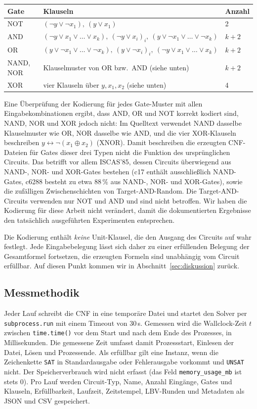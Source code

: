 \documentclass[a4paper,12pt]{article}
\theoremstyle{definition}
\begin{document}
\begin{center}
\begin{tabular}{lll}
\toprule
Gate & Klauseln & Anzahl \\
\midrule
NOT & $(\neg y \vee \neg x_1),\ (y \vee x_1)$ & 2 \\
AND & $(\neg y \vee x_1 \vee \ldots \vee x_k),\ (\neg y \vee x_i)_{i},\ (y \vee \neg x_1 \vee \ldots \vee \neg x_k)$ & $k+2$ \\
OR & $(y \vee \neg x_1 \vee \ldots \vee \neg x_k),\ (y \vee \neg x_i)_{i},\ (\neg y \vee x_1 \vee \ldots \vee x_k)$ & $k+2$ \\
NAND, NOR & Klauselmuster von OR bzw.\ AND (siehe unten) & $k+2$ \\
XOR & vier Klauseln über $y, x_1, x_2$ (siehe unten) & 4 \\
\bottomrule
\end{tabular}
\end{center}

Eine Überprüfung der Kodierung für jedes Gate-Muster mit allen Eingabe\-kombinationen ergibt, dass AND, OR und NOT korrekt kodiert sind, NAND, NOR und XOR jedoch nicht: Im Quelltext verwendet NAND dasselbe Klauselmuster wie OR, NOR dasselbe wie AND, und die vier XOR-Klauseln beschreiben $y \leftrightarrow \neg(x_1 \oplus x_2)$ (XNOR). Damit beschreiben die erzeugten CNF-Dateien für Gates dieser drei Typen nicht die Funktion des ursprünglichen Circuits. Das betrifft vor allem ISCAS'85, dessen Circuits überwiegend aus NAND-, NOR- und XOR-Gates bestehen (c17 enthält ausschließlich NAND-Gates, c6288 besteht zu etwa $88\,\%$ aus NAND-, NOR- und XOR-Gates), sowie die zufälligen Zwischenschichten von Target-AND-Random. Die Target-AND-Circuits verwenden nur NOT und AND und sind nicht betroffen. Wir haben die Kodierung für diese Arbeit nicht verändert, damit die dokumentierten Ergebnisse den tatsächlich ausgeführten Experimenten entsprechen.

Die Kodierung enthält \emph{keine} Unit-Klausel, die den Ausgang des Circuits auf wahr festlegt. Jede Eingabebelegung lässt sich daher zu einer erfüllenden Belegung der Gesamtformel fortsetzen, die erzeugten Formeln sind unabhängig vom Circuit erfüllbar. Auf diesen Punkt kommen wir in Abschnitt~\ref{sec:diskussion} zurück.

\subsection{Messmethodik}
\label{sec:messung}

Jeder Lauf schreibt die CNF in eine temporäre Datei und startet den Solver per \texttt{subprocess.run} mit einem Timeout von 30\,s. Gemessen wird die Wallclock-Zeit $t$ zwischen \texttt{time.time()} vor dem Start und nach dem Ende des Prozesses, in Millisekunden. Die gemessene Zeit umfasst damit Prozessstart, Einlesen der Datei, Lösen und Prozessende. Als erfüllbar gilt eine Instanz, wenn die Zeichenkette \texttt{SAT} in Standardausgabe oder Fehlerausgabe vorkommt und \texttt{UNSAT} nicht. Der Speicherverbrauch wird nicht erfasst (das Feld \texttt{memory\_usage\_mb} ist stets $0$). Pro Lauf werden Circuit-Typ, Name, Anzahl Eingänge, Gates und Klauseln, Erfüllbarkeit, Laufzeit, Zeitstempel, LBV-Runden und Metadaten als JSON und CSV gespeichert.
\end{document}
